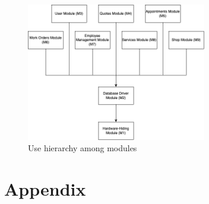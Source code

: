 \documentclass[12pt, titlepage]{article}
\begin{document}
\begin{figure}[H]
	\centering
	\includegraphics[width=0.7\textwidth]{UsesHierarchy.png}
	\caption{Use hierarchy among modules}
	\label{FigUH}
\end{figure}

\newpage




\newpage

\section{Appendix}
\end{document}
